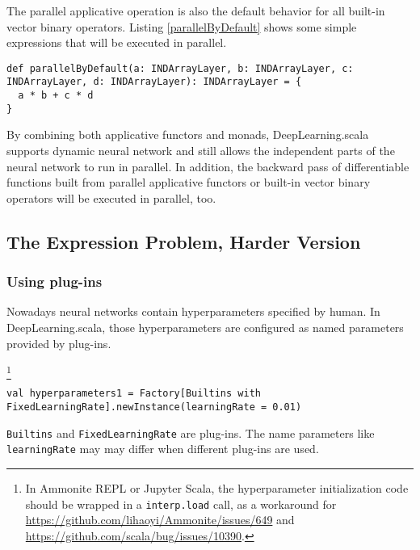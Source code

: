 The parallel applicative operation is also the default behavior for all built-in vector binary operators. Listing \ref{parallelByDefault} shows some simple expressions that will be executed in parallel.

\begin{lstlisting}[caption={By default, \lstinline{a * b} and \lstinline{c * d} will be executed in parallel because they are independent}, label={parallelByDefault}]
def parallelByDefault(a: INDArrayLayer, b: INDArrayLayer, c: INDArrayLayer, d: INDArrayLayer): INDArrayLayer = {
  a * b + c * d
}
\end{lstlisting}

By combining both applicative functors and monads, DeepLearning.scala supports dynamic neural network and still allows the independent parts of the neural network to run in parallel. In addition, the backward pass of differentiable functions built from parallel applicative functors or built-in vector binary operators will be executed in parallel, too.

\subsection{The Expression Problem, Harder Version}

\subsubsection{Using \Glspl{plug-in}}

Nowadays neural networks contain hyperparameters specified by human. In DeepLearning.scala, those hyperparameters are configured as named parameters provided by \glspl{plug-in}.

\footnote{In Ammonite REPL\cite{lihaoyi2017ammonite} or Jupyter Scala\cite{alexarchambault2017jupyter}, the hyperparameter initialization code should be wrapped in a \lstinline{interp.load} call, as a workaround for \url{https://github.com/lihaoyi/Ammonite/issues/649} and \url{https://github.com/scala/bug/issues/10390}.}

\begin{lstlisting}[caption={Configuring hyperparameters with a fixed learning rate}, label={hyperparameters1}]
val hyperparameters1 = Factory[Builtins with FixedLearningRate].newInstance(learningRate = 0.01)
\end{lstlisting}

\lstinline{Builtins} and \lstinline{FixedLearningRate} are \glspl{plug-in}. The name parameters like \lstinline{learningRate} may may differ when different \glspl{plug-in} are used.

